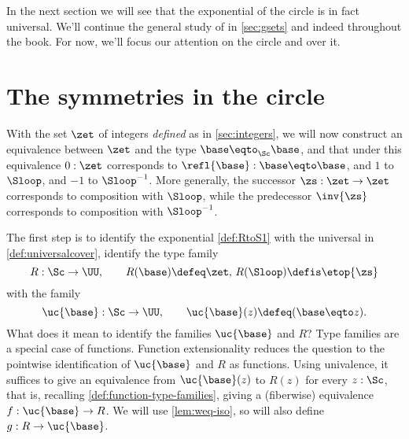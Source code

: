 In the next section we will see that the exponential \covering
of the circle is in fact universal.
We'll continue the general study of \coverings in \cref{sec:gsets}
and indeed throughout the book.
For now, we'll focus our attention on the circle and \coverings over it.

\section{The symmetries in the circle}
\label{sec:symcirc}

With the set $\zet$ of integers \emph{defined} as in \cref{sec:integers},
we will now construct an equivalence between $\zet$ and the type
$\base\eqto_{\Sc}\base$, and that under this equivalence $0:\zet$ corresponds to
$\refl{\base}:\base\eqto \base$, and $1$ to $\Sloop$, and $-1$ to $\Sloop^{-1}$.
More generally, the successor $\zs:\zet\to\zet$ corresponds to composition  
with $\Sloop$, while the predecessor $\inv{\zs}$ corresponds to composition 
with $\Sloop^{-1}$.

The first step is to identify the exponential \covering \cref{def:RtoS1}
with the universal \covering in \cref{def:universalcover},
\ie identify the type family
\[
  R: \Sc\to\UU,\qquad R(\base)\defeq\zet,\, R(\Sloop)\defis \etop{\zs}
\]
with the family
\[
\uc{\base}:\Sc\to\UU,\qquad \uc{\base}(z)\defeq (\base\eqto z).
\]
What does it mean to identify the families $\uc{\base}$ and $R$?
Type families are a special case of functions.
Function extensionality reduces the question to the pointwise
identification of $\uc{\base}$ and $R$ as functions.
Using univalence, it suffices to give
an equivalence from $\uc{\base}(z)$ to $R(z)$ for every $z:\Sc$,
that is, recalling \cref{def:function-type-families}, giving
a (fiberwise) equivalence $f: \uc{\base}\to R$. We will use
\cref{lem:weq-iso}, so will also define $g: R\to\uc{\base}$.

